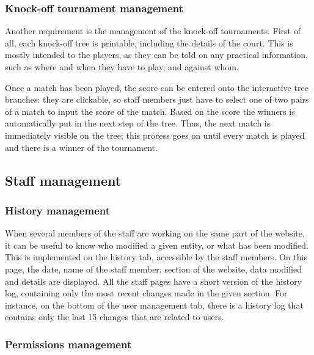 \subsubsection{Knock-off tournament management}
\label{subs:Knock-off tournament management}

Another requirement is the management of the knock-off tournaments. First of
all, each knock-off tree is printable, including the details of the court.
This is mostly intended to the players, as they can be told on any practical
information, such as where and when they have to play, and against whom.
\newline

Once a match has been played, the score can be entered onto the interactive
tree branches: they are clickable, so staff members just have to select one of
two pairs of a match to input the score of the match. Based on the score
the winners is automatically put in the next step of the tree. Thus, the next
match is immediately visible on the tree; this process goes on until every
match is played and there is a winner of the tournament.

\subsection{Staff management}
\label{sub:Staff management}

\subsubsection{History management}
\label{subs:History management}

When several members of the staff are working on the same part of the website,
it can be useful to know who modified a given entity, or what has been modified.
This is implemented on the history tab, accessible by the staff members. On
this page, the date, name of the staff member, section of the website, data
modified and details are displayed. All the staff pages have a short version of
the history log, containing only the most recent changes made in the given
section. For instance, on the bottom of the user management tab, there is a
history log that contains only the last 15 changes that are related to users.

\subsubsection{Permissions management}
\label{subs:Permissions management}

